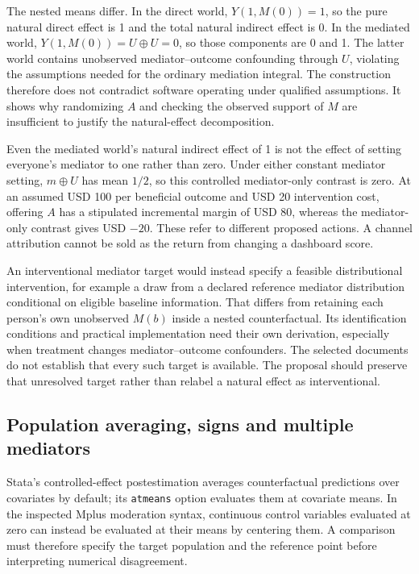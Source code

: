 The nested means differ. In the direct world, $Y(1,M(0))=1$, so the pure natural direct effect is 1 and the total natural indirect effect is 0. In the mediated world,
$Y(1,M(0))=U\oplus U=0$, so those components are 0 and 1. The latter world contains unobserved mediator--outcome confounding through $U$, violating the assumptions needed for the ordinary mediation integral. The construction therefore does not contradict software operating under qualified assumptions. It shows why randomizing $A$ and checking the observed support of $M$ are insufficient to justify the natural-effect decomposition.

Even the mediated world's natural indirect effect of 1 is not the effect of setting everyone's mediator to one rather than zero. Under either constant mediator setting, $m\oplus U$ has mean $1/2$, so this controlled mediator-only contrast is zero. At an assumed USD 100 per beneficial outcome and USD 20 intervention cost, offering $A$ has a stipulated incremental margin of USD 80, whereas the mediator-only contrast gives USD $-20$. These refer to different proposed actions. A channel attribution cannot be sold as the return from changing a dashboard score.

An interventional mediator target would instead specify a feasible distributional intervention, for example a draw from a declared reference mediator distribution conditional on eligible baseline information. That differs from retaining each person's own unobserved $M(b)$ inside a nested counterfactual. Its identification conditions and practical implementation need their own derivation, especially when treatment changes mediator--outcome confounders. The selected documents do not establish that every such target is available. The proposal should preserve that unresolved target rather than relabel a natural effect as interventional.

\subsection{Population averaging, signs and multiple mediators}
\label{exec20:med-population}
Stata's controlled-effect postestimation averages counterfactual predictions over covariates by default; its \texttt{atmeans} option evaluates them at covariate means. In the inspected Mplus moderation syntax, continuous control variables evaluated at zero can instead be evaluated at their means by centering them. A comparison must therefore specify the target population and the reference point before interpreting numerical disagreement.~\citep{exec20_med_stata_post,exec20_med_mplus_ch17}

